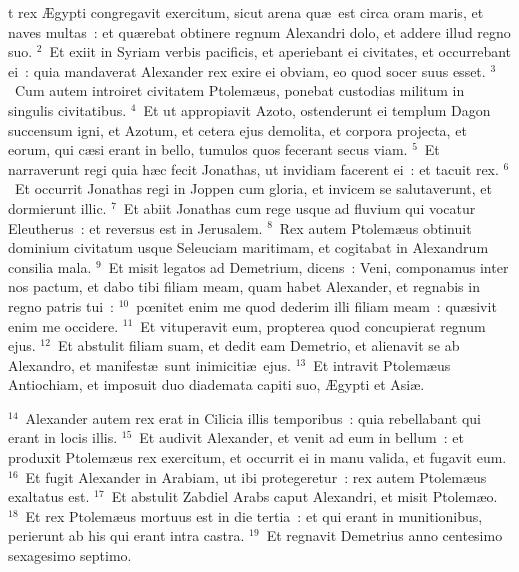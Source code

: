 \bchapter
{}t rex \AE gypti congregavit exercitum, sicut arena qu\ae\ est circa oram maris, et naves multas~: et qu\ae rebat obtinere regnum Alexandri dolo, et addere illud regno suo.
${}^{2}$~Et exiit in Syriam verbis pacificis, et aperiebant ei civitates, et occurrebant ei~: quia mandaverat Alexander rex exire ei obviam, eo quod socer suus esset.
${}^{3}$~Cum autem introiret civitatem Ptolem\ae us, ponebat custodias militum in singulis civitatibus.
${}^{4}$~Et ut appropiavit Azoto, ostenderunt ei templum Dagon succensum igni, et Azotum, et cetera ejus demolita, et corpora projecta, et eorum, qui c\ae si erant in bello, tumulos quos fecerant secus viam.
${}^{5}$~Et narraverunt regi quia h\ae c fecit Jonathas, ut invidiam facerent ei~: et tacuit rex.
${}^{6}$~Et occurrit Jonathas regi in Joppen cum gloria, et invicem se salutaverunt, et dormierunt illic.
${}^{7}$~Et abiit Jonathas cum rege usque ad fluvium qui vocatur Eleutherus~: et reversus est in Jerusalem.
${}^{8}$~Rex autem Ptolem\ae us obtinuit dominium civitatum usque Seleuciam maritimam, et cogitabat in Alexandrum consilia mala.
${}^{9}$~Et misit legatos ad Demetrium, dicens~: Veni, componamus inter nos pactum, et dabo tibi filiam meam, quam habet Alexander, et regnabis in regno patris tui~:
${}^{10}$~pœnitet enim me quod dederim illi filiam meam~: qu\ae sivit enim me occidere.
${}^{11}$~Et vituperavit eum, propterea quod concupierat regnum ejus.
${}^{12}$~Et abstulit filiam suam, et dedit eam Demetrio, et alienavit se ab Alexandro, et manifest\ae\ sunt inimiciti\ae\ ejus.
${}^{13}$~Et intravit Ptolem\ae us Antiochiam, et imposuit duo diademata capiti suo, \AE gypti et Asi\ae .


${}^{14}$~Alexander autem rex erat in Cilicia illis temporibus~: quia rebellabant qui erant in locis illis.
${}^{15}$~Et audivit Alexander, et venit ad eum in bellum~: et produxit Ptolem\ae us rex exercitum, et occurrit ei in manu valida, et fugavit eum.
${}^{16}$~Et fugit Alexander in Arabiam, ut ibi protegeretur~: rex autem Ptolem\ae us exaltatus est.
${}^{17}$~Et abstulit Zabdiel Arabs caput Alexandri, et misit Ptolem\ae o.
${}^{18}$~Et rex Ptolem\ae us mortuus est in die tertia~: et qui erant in munitionibus, perierunt ab his qui erant intra castra.
${}^{19}$~Et regnavit Demetrius anno centesimo sexagesimo septimo.


